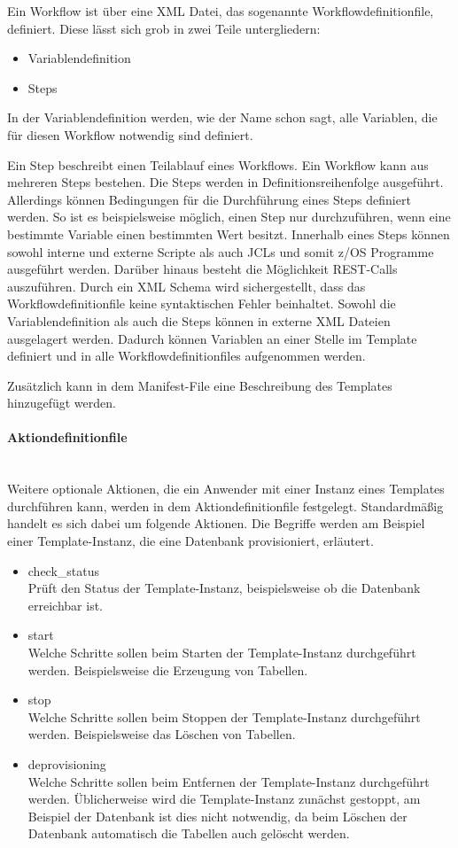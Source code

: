 Ein Workflow ist über eine XML Datei, das sogenannte \glqq Workflowdefinitionfile\grqq, definiert.
Diese lässt sich grob in zwei Teile untergliedern:
\begin{itemize}
\item Variablendefinition
\item Steps
\end{itemize}
In der Variablendefinition werden, wie der Name schon sagt, alle Variablen, die für diesen Workflow notwendig sind definiert.

Ein Step beschreibt einen Teilablauf eines Workflows.
Ein Workflow kann aus mehreren Steps bestehen.
Die Steps werden in Definitionsreihenfolge ausgeführt.
Allerdings können Bedingungen für die Durchführung eines Steps definiert werden.
So ist es beispielsweise möglich, einen Step nur durchzuführen, wenn eine bestimmte Variable einen bestimmten Wert besitzt.
Innerhalb eines Steps können sowohl interne und externe Scripte als auch JCLs und somit z/OS Programme ausgeführt werden.
Darüber hinaus besteht die Möglichkeit REST-Calls auszuführen.
Durch ein XML Schema wird sichergestellt, dass das Workflowdefinitionfile keine syntaktischen Fehler beinhaltet.
Sowohl die Variablendefinition als auch die Steps können in externe XML Dateien ausgelagert werden.
Dadurch können Variablen an einer Stelle im Template definiert und in alle Workflowdefinitionfiles aufgenommen werden.
\cite[S. 140]{Rotthove.2018}

Zusätzlich kann in dem Manifest-File eine Beschreibung des Templates hinzugefügt werden.
\cite{.26.2.2020}
\paragraph{\glqq Aktiondefinitionfile\grqq} ~\\
Weitere optionale Aktionen, die ein Anwender mit einer Instanz eines Templates durchführen kann, werden in dem Aktiondefinitionfile festgelegt.
Standardmäßig handelt es sich dabei um folgende Aktionen.
Die Begriffe werden am Beispiel einer Template-Instanz, die eine Datenbank provisioniert, erläutert.
\begin{itemize}
\item check\_status\\
Prüft den Status der Template-Instanz, beispielsweise ob die Datenbank erreichbar ist.
\item start\\
Welche Schritte sollen beim Starten der Template-Instanz durchgeführt werden.
Beispielsweise die Erzeugung von Tabellen.
\item stop\\
Welche Schritte sollen beim Stoppen der Template-Instanz durchgeführt werden.
Beispielsweise das Löschen von Tabellen.
\item deprovisioning\\
Welche Schritte sollen beim Entfernen der Template-Instanz durchgeführt werden.
Üblicherweise wird die Template-Instanz zunächst gestoppt, am Beispiel der Datenbank ist dies nicht notwendig, da beim Löschen der Datenbank automatisch die Tabellen auch gelöscht werden.
\end{itemize}

